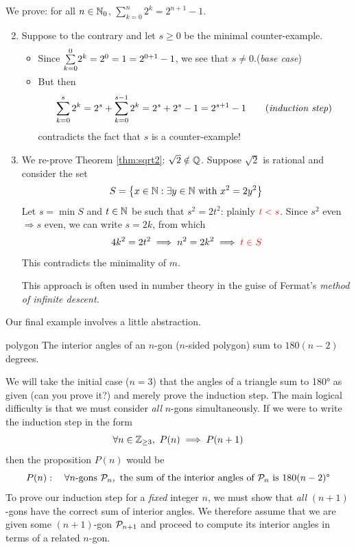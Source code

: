 \begin{examples}{}{}
	\exstart We prove: for all $n\in\mathbb{N}_0$, $\sum\limits_{k=0}^n 2^k=2^{n+1}-1$.\vspace{-10pt}
	
	\begin{enumerate}\setcounter{enumi}{1}
	  \item[]Suppose to the contrary and let $s\ge 0$ be the minimal counter-example.
	  \begin{itemize}
	    \item Since $\smash{\sum\limits_{k=0}^0} 2^k=2^0=1=2^{0+1}-1$, we see that $s\neq 0$.\hfill (\emph{base case})
	    \item But then
	    \[
	    	\sum\limits_{k=0}^s2^k=2^s+\sum\limits_{k=0}^{s-1} 2^k =2^s+2^s-1=2^{s+1}-1 \tag{\emph{induction step}}
	    \]
	    contradicts the fact that $s$ is a counter-example!
	  \end{itemize} 
	  
	  
	  \item We re-prove Theorem \ref{thm:sqrt2}: $\sqrt 2\notin\mathbb{Q}$. Suppose $\sqrt 2$ is rational and consider the set
	  \[
	  	S=\bigl\{x\in\mathbb{N}:\exists y\in \mathbb{N}\text{ with }x^2=2y^2\bigr\}
	  \]
	  Let $s=\min S$ and $t\in\mathbb{N}$ be such that $s^2=2t^2$: plainly $\textcolor{red}{t<s}$. Since $s^2$ even $\Longrightarrow s$ even, we can write $s=2k$, from which
	  \[
	  	4k^2=2t^2\implies n^2=2k^2\implies \textcolor{red}{t\in S}
	  \]
	  This contradicts the minimality of $m$.\par
	  This approach is often used in number theory in the guise of Fermat's \emph{method of infinite descent.}
	\end{enumerate}
\end{examples}

\iffalse

Our final example involves a little abstraction.

\begin{thm}{}{polygon}
	The interior angles of an $n$-gon ($n$-sided polygon) sum to $180(n-2)$ degrees.
\end{thm}

We will take the initial case ($n=3$) that the angles of a triangle sum to \ang{180} as given (can you prove it?) and merely prove the induction step. The main logical difficulty is that we must consider \emph{all} $n$-gons simultaneously. If we were to write the induction step in the form
\[
	\forall n\in\mathbb{Z}_{\ge 3},\ P(n)\implies P(n+1)
\]
then the proposition $P(n)$ would be
\[
	P(n):\quad \forall n\text{-gons }\mathcal{P}_n,\text{ the sum of the interior angles of $\mathcal{P}_n$ is $180(n-2)$\textdegree}
\]
To prove our induction step for a \emph{fixed} integer $n$, we must show that \emph{all} $(n+1)$-gons have the correct sum of interior angles. We therefore assume that we are given some $(n+1)$-gon $\mathcal{P}_{n+1}$ and proceed to compute its interior angles in terms of a related $n$-gon.


